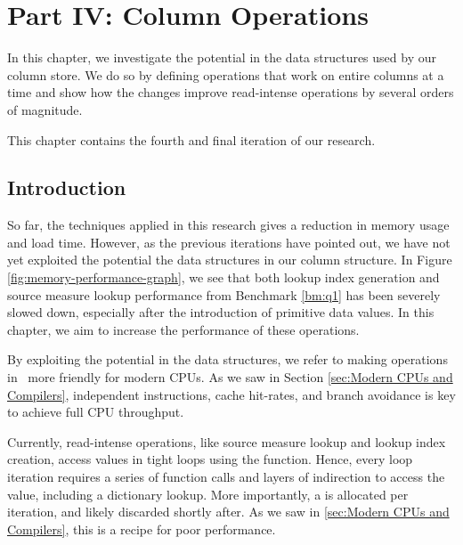\chapter{Part IV: Column Operations}
\label{chap:operations}

In this chapter, we investigate the potential in the data structures used by our column store. We do so by defining operations that work on entire columns at a time and show how the changes improve read-intense operations by several orders of magnitude.

This chapter contains the fourth and final iteration of our research.

\clearpage

\section{Introduction}
\label{sec:Introduction}
So far, the techniques applied in this research gives a reduction in memory usage and load time. However, as the previous iterations have pointed out, we have not yet exploited the potential the data structures in our column structure. In Figure \ref{fig:memory-performance-graph}, we see that both lookup index generation and source measure lookup performance from Benchmark \ref{bm:q1} has been severely slowed down, especially after the introduction of primitive data values. In this chapter, we aim to increase the performance of these operations.

By exploiting the potential in the data structures, we refer to making operations in \gap~more friendly for modern CPUs. As we saw in Section \ref{sec:Modern CPUs and Compilers}, independent instructions, cache hit-rates, and branch avoidance is key to achieve full CPU throughput. 

Currently, read-intense operations, like source measure lookup and lookup index creation, access values in tight loops using the  function. Hence, every loop iteration requires a series of function calls and layers of indirection to access the value, including a dictionary lookup. More importantly, a  is allocated per iteration, and likely discarded shortly after. As we saw in \ref{sec:Modern CPUs and Compilers}, this is a recipe for poor performance.

